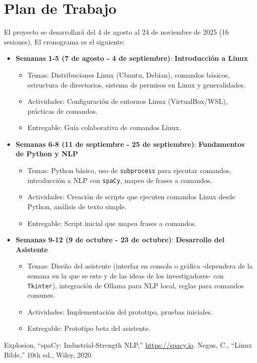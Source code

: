 \documentclass[conference, a4paper]{IEEEtran}
\begin{document}
\section{Plan de Trabajo}
El proyecto se desarrollará del 4 de agosto al 24 de noviembre de 2025 (16 sesiones). El cronograma es el siguiente:

\begin{itemize}
    \item \textbf{Semanas 1-5 (7 de agosto - 4 de septiembre)}: \textbf{Introducción a Linux}
        \begin{itemize}
            \item Temas: Distribuciones Linux (Ubuntu, Debian), comandos básicos, estructura de directorios, sistema de permisos en Linux y generalidades.
            \item Actividades: Configuración de entornos Linux (VirtualBox/WSL), prácticas de comandos.
            \item Entregable: Guía colaborativa de comandos Linux.
        \end{itemize}
    \item \textbf{Semanas 6-8 (11 de septiembre - 25 de septiembre)}: \textbf{Fundamentos de Python y NLP}
        \begin{itemize}
            \item Temas: Python básico, uso de \texttt{subprocess} para ejecutar comandos, introducción a NLP con \texttt{spaCy}, mapeo de frases a 
                         comandos.
            \item Actividades: Creación de scripts que ejecuten comandos Linux desde Python, análisis de texto simple.
            \item Entregable: Script inicial que mapea frases a comandos.
        \end{itemize}
    \item \textbf{Semanas 9-12 (9 de octubre - 23 de octubre)}: \textbf{Desarrollo del Asistente}
        \begin{itemize}
            \item Temas: Diseño del asistente (interfaz en consola o gráfica -dependera de la semana en la que se este y de las ideas de los
                         investigadores- con \texttt{Tkinter}), integración de Ollama para NLP local, reglas para comandos comunes.
            \item Actividades: Implementación del prototipo, pruebas iniciales.
            \item Entregable: Prototipo beta del asistente.
        \end{itemize}
\end{itemize}

\begin{thebibliography}{1}
 Explosion, ``spaCy: Industrial-Strength NLP,'' \url{https://spacy.io}.
 Negus, C., ``Linux Bible,'' 10th ed., Wiley, 2020.
\end{thebibliography}
\end{document}
